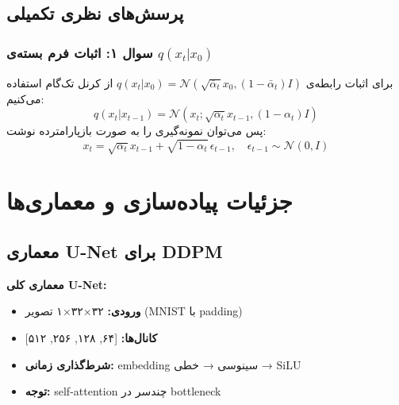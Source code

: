 \subsection{پرسش‌های نظری تکمیلی}

\subsubsection*{سوال ۱: اثبات فرم بسته‌ی $q(x_t|x_0)$}
برای اثبات رابطه‌ی
$q(x_t|x_0)=\mathcal{N}(\sqrt{\bar{\alpha}_t}x_0,(1-\bar{\alpha}_t)I)$
از کرنل تک‌گام استفاده می‌کنیم:
\begin{equation}
q(x_t|x_{t-1})=\mathcal{N}(x_t;\sqrt{\alpha_t}x_{t-1},(1-\alpha_t)I)
\end{equation}
پس می‌توان نمونه‌گیری را به صورت بازپارامترده نوشت:
\begin{equation}
x_t=\sqrt{\alpha_t}x_{t-1}+\sqrt{1-\alpha_t}\,\epsilon_{t-1},\quad \epsilon_{t-1}\sim\mathcal{N}(0,I)
\end{equation}

\section{جزئیات پیاده‌سازی و معماری‌ها}

\subsection{معماری U-Net برای DDPM}

\textbf{معماری کلی U-Net:}
\begin{itemize}
    \item \textbf{ورودی:} ۳۲×۳۲×۱ تصویر (MNIST با padding)
    \item \textbf{کانال‌ها:} [۶۴, ۱۲۸, ۲۵۶, ۵۱۲]
    \item \textbf{شرط‌گذاری زمانی:} embedding سینوسی → خطی → SiLU
    \item \textbf{توجه:} self-attention چندسر در bottleneck
\end{itemize}

